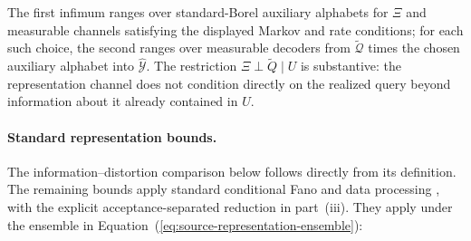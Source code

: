 \documentclass[10pt]{article} %
\renewcommand{\eqref}[1]{\textup{(\ref{#1})}}
\providecommand{\1}{\mathbf{1}}  %
\theoremstyle{remark}
\theoremstyle{definition}
\begin{document}
The first infimum ranges over standard-Borel auxiliary alphabets for $\Xi$ and measurable channels satisfying the displayed Markov and rate conditions; for each such choice, the second ranges over measurable decoders from $\widetilde{\mathcal Q}$ times the chosen auxiliary alphabet into $\widehat{\mathcal Y}$. The restriction $\Xi\perp\widetilde Q\mid U$ is substantive: the representation channel does not condition directly on the realized query beyond information about it already contained in $U$.

\paragraph{Standard representation bounds.}

The information--distortion comparison below follows directly from its
definition. The remaining bounds apply standard conditional Fano and data
processing \citep[Sections~2.8 and~2.10]{cover2006elements}, with the explicit
acceptance-separated reduction in part~(iii). They apply under the
ensemble in Equation~\eqref{eq:source-representation-ensemble}:
\end{document}
